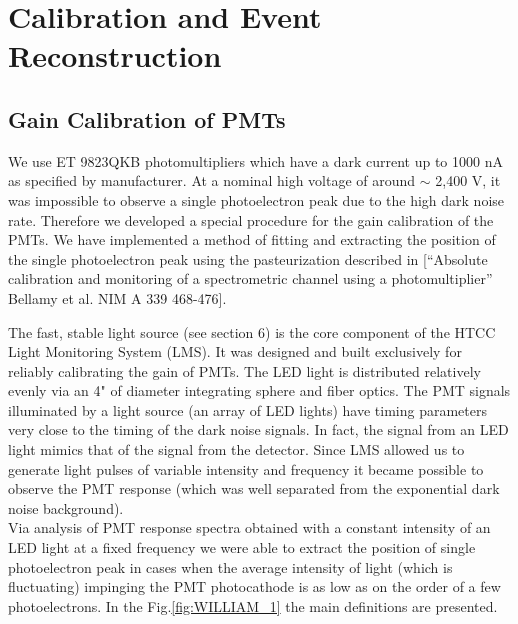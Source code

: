 \section{Calibration and Event Reconstruction}
\subsection{Gain Calibration of PMTs} 
We use ET 9823QKB photomultipliers which have a dark current up to 1000 nA as specified by manufacturer. At a nominal high voltage of around $\sim$ 2,400 V, it was impossible to observe a single photoelectron peak due to the high dark noise rate. Therefore we developed a special procedure for the gain calibration of the PMTs. We have implemented a method of fitting and extracting the position of the single photoelectron peak using the pasteurization described in [“Absolute calibration and monitoring of a spectrometric channel using a photomultiplier” Bellamy et al. NIM A 339 468-476].  

The fast, stable light source (see section 6) is the core component of the HTCC Light Monitoring System (LMS). It was designed and built exclusively for reliably calibrating the gain of PMTs. The LED light is distributed relatively evenly via an 4" of diameter integrating sphere and fiber optics. The PMT signals illuminated by a light source (an array of LED lights) have timing parameters very close to the timing of the dark noise signals. In fact, the signal from an LED light mimics that of the signal from the detector. Since LMS allowed us to generate light pulses of variable intensity and frequency it became possible to observe the PMT response (which was well separated from the exponential dark noise background). \\
\indent Via analysis of PMT response spectra obtained with a constant intensity of an LED light at a fixed frequency we were able to extract the  position of single photoelectron peak in cases when the average intensity of light (which is fluctuating) impinging the PMT photocathode is as low as on the order of a few photoelectrons. In the Fig.\ref{fig:WILLIAM_1} the main definitions are presented.  

